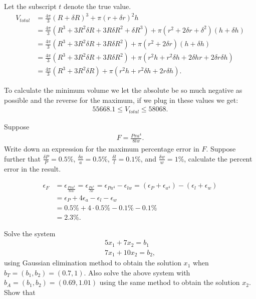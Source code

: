 \documentclass[10pt]{article}
\begin{document}
\begin{solution}[2]  \label{sol:2}
Let the subscript \(t\) denote the true value.
\begin{align*}
V _{total}  &  = \frac{4 \pi}{3} (R + \delta R)^{3} + \pi (r+ \delta r) ^2 h \\
& = \frac{4 \pi}{3} (R^{3} + 3 R^2 \delta R + 3 R \delta R ^2 + \delta R^{3})
+ \pi (r ^2 + 2 \delta r+ \delta ^2) (h + \delta h) \\
& = \frac{4 \pi}{3} (R^{3} + 3 R^2 \delta R + 3 R \delta R ^2)
+ \pi (r ^2 + 2 \delta r) (h + \delta h) \\
& = \frac{4 \pi}{3} (R^{3} + 3 R^2 \delta R + 3 R \delta R ^2)
+ \pi (r ^2 h + r ^2 \delta h + 2 \delta h r + 2 \delta r \delta h) \\
& = \frac{4 \pi}{3} (R^{3} + 3 R^2 \delta R)
+ \pi (r ^2 h + r ^2 \delta h + 2r \delta h )
.
\end{align*}

To calculate the minimum volume we let the absolute be so much negative
as possible and the reverse for the maximum, if we plug in these values
we get:
\begin{align*}
55668.1 \leq V _{total} \leq 58068
.
\end{align*}


\end{solution}
\begin{exercise}[3]  \label{exe:3}
Suppose
\begin{align*}
F = \frac{P \pi a^{4} }{8lw} 
.
\end{align*}
Write down an expression for the maximum percentage error in \(F\). Suppose
further that \(\frac{\delta P}{P} = 0.5\%\), \(\frac{\delta a}{a} = 0.5 \%\), \(\frac{\delta l}{l} = 0.1\%\), and \(\frac{\delta w}{w} = 1\%\), calculate the
percent error in the result.
\end{exercise}
\begin{solution}[3]  \label{sol:3}
\begin{align*}
\epsilon _{F}  &  = \epsilon _{\frac{P \pi a^{4}}{8 l w}} = \epsilon _{\frac{P a^{4}}{ l w} }
= \epsilon _{P a^{4}} - \epsilon _{l w} = (\epsilon _{P} + \epsilon _{a^{4}}) - (\epsilon _{l} + \epsilon _{w}) \\
& = \epsilon _{P} + 4 \epsilon _{a} - \epsilon _{l} - \epsilon _{w} \\
& = 0.5 \% + 4 \cdot 0.5\% - 0.1 \% - 0.1 \% \\
& = 2.3 \%
.
\end{align*}

\end{solution}
\begin{exercise}[4]  \label{exe:4}
Solve the system
\begin{align*}
5x_1 + 7x_2 = b_1 \\
7x_1 + 10x_2 = b_2
,
\end{align*}
using Gaussian elimination method to obtain the solution \(x_1\)
when \(b _{T} = (b_1, b_2) = (0.7, 1)\). Also solve the above system
with \(b_A = (b_1, b_2) = (0.69, 1.01)\) using the same method to
obtain the solution \(x_2\). Show that

\end{exercise}
\end{document}
